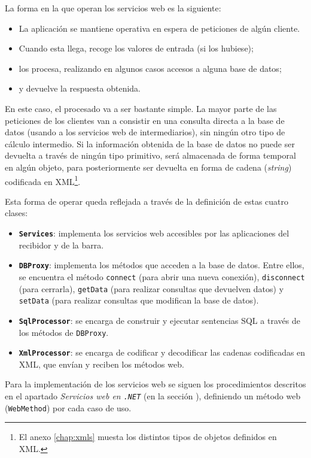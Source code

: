La forma en la que operan los servicios web es la siguiente:
\begin{itemize}
\item La aplicación se mantiene operativa en espera de peticiones de algún
cliente.
\item Cuando esta llega, recoge los valores de entrada (si los hubiese);
\item los procesa, realizando en algunos casos accesos a alguna base de datos;
\item y devuelve la respuesta obtenida.
\end{itemize}

En este caso, el procesado va a ser bastante simple. La mayor parte de las
peticiones de los clientes van a consistir en una consulta directa a la base
de datos (usando a los servicios web de intermediarios), sin ningún otro
tipo de cálculo intermedio. Si la información obtenida de la base de datos 
no puede ser devuelta a través de ningún tipo primitivo, será almacenada de 
forma temporal en algún objeto, para posteriormente ser devuelta en forma de
cadena (\emph{string}) codificada en \acs{XML}\footnote{El anexo
\ref{chap:xmls} muesta los distintos tipos de objetos definidos en \acs{XML}.}.

Esta forma de operar queda reflejada a través de la definición de estas cuatro 
clases:
\begin{itemize}
\item \textbf{\texttt{Services}}: implementa los servicios web accesibles por 
las aplicaciones del recibidor y de la barra.
\item \textbf{\texttt{DBProxy}}: implementa los métodos que acceden a la base 
de datos. Entre ellos, se encuentra el método \texttt{connect} (para abrir una 
nueva conexión), \texttt{disconnect} (para cerrarla), \texttt{getData} (para 
realizar consultas que devuelven datos) y \texttt{setData} (para realizar
consultas que modifican la base de datos).
\item \textbf{\texttt{SqlProcessor}}: se encarga de construir y ejecutar 
sentencias \acs{SQL} a través de los métodos de \texttt{DBProxy}.
\item \textbf{\texttt{XmlProcessor}}: se encarga de codificar y decodificar las 
cadenas codificadas en \acs{XML}, que envían y reciben los métodos web.
\end{itemize}

Para la implementación de los servicios web se siguen los procedimientos
descritos en el apartado \emph{Servicios web en \texttt{.NET}} (en la sección
\label{subsec:webServicesApp}), definiendo un método web (\texttt{WebMethod})
por cada caso de uso.


